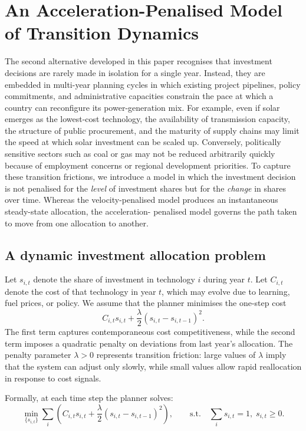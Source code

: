 \documentclass[preprint,authoryear,12pt]{elsarticle}
\begin{document}
\section{An Acceleration-Penalised Model of Transition Dynamics}

The second alternative developed in this paper recognises that investment decisions are rarely
made in isolation for a single year. Instead, they are embedded in multi-year planning cycles in
which existing project pipelines, policy commitments, and administrative capacities constrain the
pace at which a country can reconfigure its power-generation mix. For example, even if solar
emerges as the lowest-cost technology, the availability of transmission capacity, the structure of
public procurement, and the maturity of supply chains may limit the speed at which solar
investment can be scaled up. Conversely, politically sensitive sectors such as coal or gas may not
be reduced arbitrarily quickly because of employment concerns or regional development priorities. To capture these transition frictions, we introduce a model in which the investment decision is not penalised
for the \emph{level} of investment shares but for the \emph{change} in shares over time. Whereas the
velocity-penalised model produces an instantaneous steady-state allocation, the acceleration-
penalised model governs the path taken to move from one allocation to another.

\subsection{A dynamic investment allocation problem}

Let $s_{i,t}$ denote the share of investment in technology $i$ during year $t$. Let $C_{i,t}$ denote
the cost of that technology in year $t$, which may evolve due to learning, fuel prices, or policy.
We assume that the planner minimises the one-step cost
\begin{equation}
    C_{i,t} s_{i,t} + \frac{\lambda}{2} (s_{i,t} - s_{i,t-1})^2.
    \label{eq:acceleration_objective}
\end{equation}
The first term captures contemporaneous cost competitiveness, while the second term imposes a
quadratic penalty on deviations from last year's allocation. The penalty parameter $\lambda>0$
represents transition friction: large values of $\lambda$ imply that the system can adjust only
slowly, while small values allow rapid reallocation in response to cost signals.

Formally, at each time step the planner solves:
\begin{equation}
    \min_{\{s_{i,t}\}} 
    \sum_i \left( C_{i,t} s_{i,t} + \frac{\lambda}{2} (s_{i,t} - s_{i,t-1})^2 \right),
    \qquad \text{s.t.} \quad \sum_i s_{i,t} = 1,\; s_{i,t} \ge 0.
\end{equation}
\end{document}
